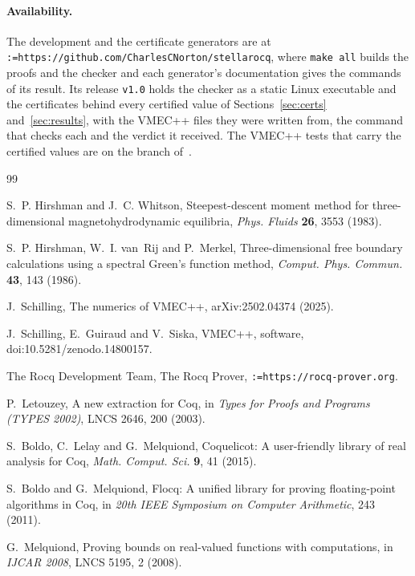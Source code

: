 \documentclass[11pt]{article}
\makeatletter
\newcommand{\code}[1]{\texttt{#1}}
\def\sq@slash{/}
\newcommand{\link}[1]{\texttt{\@tfor\sq@t:=#1\do{\sq@t\ifx\sq@t\sq@slash\allowbreak\fi}}}
\makeatother
\begin{document}
\paragraph{Availability.}
The development and the certificate generators are at
\link{https://github.com/CharlesCNorton/stellarocq}, where \code{make all}
builds the proofs and the checker and each generator's documentation gives the
commands of its result. Its release \code{v1.0} holds the checker as a static
Linux executable and the certificates behind every certified value of
Sections~\ref{sec:certs} and~\ref{sec:results}, with the VMEC++ files they were
written from, the command that checks each and the verdict it received. The
VMEC++ tests that carry the certified values are on the branch of~\cite{branch}.

\begin{thebibliography}{99}\small\raggedright
\setlength{\itemsep}{1pt}

S.~P. Hirshman and J.~C. Whitson, Steepest-descent moment method for
three-dimensional magnetohydrodynamic equilibria, \emph{Phys. Fluids}
\textbf{26}, 3553 (1983).

S.~P. Hirshman, W.~I. van~Rij and P.~Merkel, Three-dimensional free boundary
calculations using a spectral Green's function method, \emph{Comput. Phys.
Commun.} \textbf{43}, 143 (1986).

J.~Schilling, The numerics of VMEC++, arXiv:2502.04374 (2025).

J.~Schilling, E.~Guiraud and V.~Siska, VMEC++, software,
doi:10.5281/zenodo.14800157.

The Rocq Development Team, The Rocq Prover, \link{https://rocq-prover.org}.

P.~Letouzey, A new extraction for Coq, in \emph{Types for Proofs and Programs
(TYPES 2002)}, LNCS 2646, 200 (2003).

S.~Boldo, C.~Lelay and G.~Melquiond, Coquelicot: A user-friendly library of
real analysis for Coq, \emph{Math. Comput. Sci.} \textbf{9}, 41 (2015).

S.~Boldo and G.~Melquiond, Flocq: A unified library for proving floating-point
algorithms in Coq, in \emph{20th IEEE Symposium on Computer Arithmetic}, 243
(2011).

G.~Melquiond, Proving bounds on real-valued functions with computations, in
\emph{IJCAR 2008}, LNCS 5195, 2 (2008).


\end{thebibliography}
\end{document}
